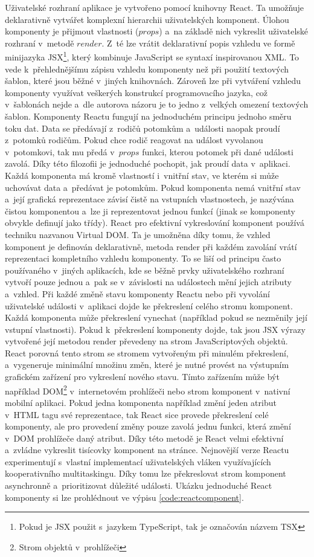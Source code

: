 Uživatelské rozhraní aplikace je vytvořeno pomocí knihovny React. Ta umožňuje deklarativně vytvářet komplexní hierarchii uživatelských komponent. Úlohou komponenty je přijmout vlastnosti ($props$) a~na základě nich vykreslit uživatelské rozhraní v~metodě $render$. Z~té lze vrátit deklarativní popis vzhledu ve formě minijazyka JSX\footnote{Pokud je JSX použit s~jazykem TypeScript, tak je označován názvem TSX}, který kombinuje JavaScript se syntaxí inspirovanou XML. To vede k~přehlednějšímu zápisu vzhledu komponenty než při použití textových šablon, které jsou běžné v~jiných knihovnách. Zároveň lze při vytváření vzhledu komponenty využívat veškerých konstrukcí programovacího jazyka, což v~šablonách nejde a~dle autorova názoru je to jedno z~velkých omezení textových šablon. Komponenty Reactu fungují na jednoduchém principu jednoho směru toku dat. Data se předávají z~rodičů potomkům a~události naopak proudí z~potomků rodičům. Pokud chce rodič reagovat na událost vyvolanou v~potomkovi, tak mu předá v~$props$ funkci, kterou potomek při dané události zavolá. Díky této filozofii je jednoduché pochopit, jak proudí data v~aplikaci. Každá komponenta má kromě vlastností i~vnitřní stav, ve kterém si může uchovávat data a~předávat je potomkům. Pokud komponenta nemá vnitřní stav a~její grafická reprezentace závisí čistě na vstupních vlastnostech, je nazývána čistou komponentou a~lze ji reprezentovat jednou funkcí (jinak se komponenty obvykle definují jako třídy).
React pro efektivní vykreslování komponent používá techniku nazvanou Virtual DOM. Ta je umožněna díky tomu, že vzhled komponent je definován deklarativně, metoda render při každém zavolání vrátí reprezentaci kompletního vzhledu komponenty. To se liší od principu často používaného v~jiných aplikacích, kde se běžně prvky uživatelského rozhraní vytvoří pouze jednou a~pak se v~závislosti na událostech mění jejich atributy a~vzhled. Při každé změně stavu komponenty Reactu nebo při vyvolání uživatelské události v~aplikaci dojde ke překreslení celého stromu komponent. Každá komponenta může překreslení vynechat (například pokud se nezměnily její vstupní vlastnosti). Pokud k~překreslení komponenty dojde, tak jsou JSX výrazy vytvořené její metodou render převedeny na strom JavaScriptových objektů. React porovná tento strom se stromem vytvořeným při minulém překreslení, a~vygeneruje minimální množinu změn, které je nutné provést na výstupním grafickém zařízení pro vykreslení nového stavu. Tímto zařízením může být například DOM\footnote{Strom objektů v~prohlížeči} v~internetovém prohlížeči nebo strom komponent v~nativní mobilní aplikaci. Pokud jedna komponenta například změní jeden atribut v~HTML tagu své reprezentace, tak React sice provede překreslení celé komponenty, ale pro provedení změny pouze zavolá jednu funkci, která změní v~DOM prohlížeče daný atribut.  Díky této metodě je React velmi efektivní a~zvládne vykreslit tisícovky komponent na stránce. Nejnovější verze Reactu experimentují s~vlastní implementací uživatelských vláken využívajících kooperativního multitaskingu. Díky tomu lze překreslovat strom komponent asynchronně a~prioritizovat důležité události. Ukázku jednoduché React komponenty si lze prohlédnout ve výpisu \ref{code:reactcomponent}.

